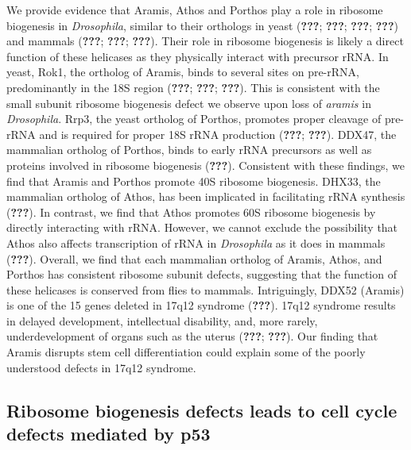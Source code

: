 \documentclass[12pt,oneside]{reedthesis}
\begin{document}
We provide evidence that Aramis, Athos and Porthos play a role in ribosome biogenesis in \emph{Drosophila}, similar to their orthologs in yeast ({\textbf{???}}; {\textbf{???}}; {\textbf{???}}; {\textbf{???}}) and mammals ({\textbf{???}}; {\textbf{???}}; {\textbf{???}}). Their role in ribosome biogenesis is likely a direct function of these helicases as they physically interact with precursor rRNA. In yeast, Rok1, the ortholog of Aramis, binds to several sites on pre-rRNA, predominantly in the 18S region ({\textbf{???}}; {\textbf{???}}; {\textbf{???}}). This is consistent with the small subunit ribosome biogenesis defect we observe upon loss of \emph{aramis} in \emph{Drosophila}. Rrp3, the yeast ortholog of Porthos, promotes proper cleavage of pre-rRNA and is required for proper 18S rRNA production ({\textbf{???}}; {\textbf{???}}). DDX47, the mammalian ortholog of Porthos, binds to early rRNA precursors as well as proteins involved in ribosome biogenesis ({\textbf{???}}). Consistent with these findings, we find that Aramis and Porthos promote 40S ribosome biogenesis. DHX33, the mammalian ortholog of Athos, has been implicated in facilitating rRNA synthesis ({\textbf{???}}). In contrast, we find that Athos promotes 60S ribosome biogenesis by directly interacting with rRNA. However, we cannot exclude the possibility that Athos also affects transcription of rRNA in \emph{Drosophila} as it does in mammals ({\textbf{???}}). Overall, we find that each mammalian ortholog of Aramis, Athos, and Porthos has consistent ribosome subunit defects, suggesting that the function of these helicases is conserved from flies to mammals. Intriguingly, DDX52 (Aramis) is one of the 15 genes deleted in 17q12 syndrome ({\textbf{???}}). 17q12 syndrome results in delayed development, intellectual disability, and, more rarely, underdevelopment of organs such as the uterus ({\textbf{???}}; {\textbf{???}}). Our finding that Aramis disrupts stem cell differentiation could explain some of the poorly understood defects in 17q12 syndrome.

\hypertarget{ribosome-biogenesis-defects-leads-to-cell-cycle-defects-mediated-by-p53}{%
\subsection{Ribosome biogenesis defects leads to cell cycle defects mediated by p53}\label{ribosome-biogenesis-defects-leads-to-cell-cycle-defects-mediated-by-p53}}
\end{document}
